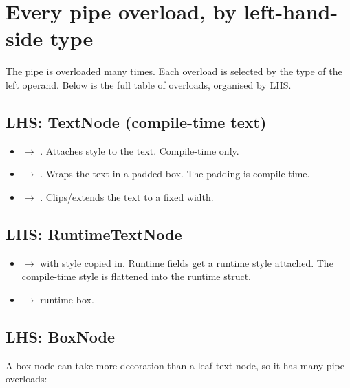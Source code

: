 \section{Every pipe overload, by left-hand-side type}

The pipe \code{|} is overloaded many times. Each overload is
selected by the type of the left operand. Below is the full
table of overloads, organised by LHS.

\subsection*{LHS: TextNode (compile-time text)}

\begin{itemize}[leftmargin=*]
  \item {} $\to$ .
    Attaches style to the text. Compile-time only.
  \item {} $\to$ .
    Wraps the text in a padded box. The padding is compile-time.
  \item {} $\to$
    . Clips/extends the text to a fixed
    width.
\end{itemize}

\subsection*{LHS: RuntimeTextNode}

\begin{itemize}[leftmargin=*]
  \item {} $\to$
     with style copied in. Runtime fields
    get a runtime style attached. The compile-time style is
    flattened into the runtime struct.
  \item {} $\to$ runtime box.
\end{itemize}

\subsection*{LHS: BoxNode}

A box node can take more decoration than a leaf text node, so it
has many pipe overloads:

